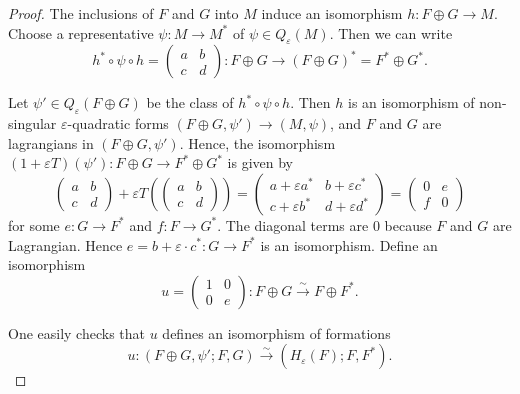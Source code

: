 \documentclass{article}
\theoremstyle{definition}
\begin{document}
\begin{proof}

The inclusions of \( F \) and \( G \) into \( M \) induce an isomorphism \( h \colon F \oplus G \to M \). Choose a representative \( \psi \colon M \to M^* \) of \( \psi \in Q_\varepsilon(M) \). Then we can write
\[
h^* \circ \psi \circ h = 
\begin{pmatrix}
a & b \\
c & d
\end{pmatrix}
\colon F \oplus G \to (F \oplus G)^* = F^* \oplus G^*.
\]

Let \( \psi' \in Q_\varepsilon(F \oplus G) \) be the class of \( h^* \circ \psi \circ h \). Then \( h \) is an isomorphism of non-singular \( \varepsilon \)-quadratic forms \( (F \oplus G, \psi') \to (M, \psi) \), and \( F \) and \( G \) are lagrangians in \( (F \oplus G, \psi') \). Hence, the isomorphism \( (1 + \varepsilon T)(\psi') \colon F \oplus G \to F^* \oplus G^* \) is given by
\[
\begin{pmatrix}
a & b \\
c & d
\end{pmatrix}
+ \varepsilon 
T\left(
\begin{pmatrix}
a & b \\
c & d
\end{pmatrix}
\right)
=
\begin{pmatrix}
a + \varepsilon a^* & b + \varepsilon c^* \\
c + \varepsilon b^* & d + \varepsilon d^*
\end{pmatrix}
=
\begin{pmatrix}
0 & e \\
f & 0
\end{pmatrix}
\]
for some \( e \colon G \to F^* \) and \( f \colon F \to G^* \). The diagonal terms are $0$ because $F$ and $G$ are Lagrangian. Hence \( e = b + \varepsilon \cdot c^* \colon G \to F^* \) is an isomorphism. Define an isomorphism
\[
u = 
\begin{pmatrix}
1 & 0 \\
0 & e
\end{pmatrix}
\colon F \oplus G \xrightarrow{\sim} F \oplus F^*.
\]

One easily checks that \( u \) defines an isomorphism of formations
\[
u \colon (F \oplus G, \psi'; F, G) \xrightarrow{\sim} (H_\varepsilon(F); F, F^*).
\]
\end{proof}
\end{document}
